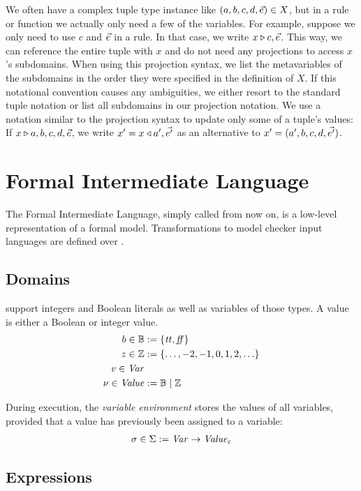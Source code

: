 \documentclass[a4paper,10pt,english]{article}
\begin{document}
	We often have a complex tuple type instance like $(a, b, c, d, \vec{e}) \in X$, but in a rule or
	function we actually only need a few of the variables. For example, suppose we only need to use $c$ and $\vec{e}$ in a rule. In that case,
	we write $x \triangleright c, \vec{e}$.
	This way, we can reference the entire tuple with $x$ and do not need any projections to access $x$'s subdomains. When using this projection syntax, we list the
	metavariables of the subdomains in the order they were specified in the definition of $X$. If this notational convention causes any ambiguities, we either
	resort to the standard tuple notation or list all subdomains in our projection notation. We use a notation similar to the
	projection syntax to update only some of a tuple's values: If $x \triangleright a, b, c, d, \vec{e}$, we write $x' = x
	\triangleleft a', \vec{e'}$ as an alternative to $x' = (a', b, c, d, \vec{e'})$.  

\section{Formal Intermediate Language}
The Formal Intermediate Language, simply called \Fil from now on, is a low-level representation of a formal model. Transformations
to model checker input languages are defined over \Fil.
\subsection{Domains}

\Fil support integers and Boolean literals as well as variables of those types. A value is either a Boolean or integer
value.
\begin{align*}
    b \in \mathbb{B} &:= \{ \mathit{tt}, \mathit{ff} \}
    \\
    z \in \mathbb{Z} &:= \{ \ldots, -2, -1, 0, 1, 2, \ldots \}
    \\
    v \in \mathit{Var}
    \\
    \nu \in \mathit{Value} &:= \mathbb{B} \mid \mathbb{Z}
\end{align*}

During execution, the \textit{variable environment} stores the values of all variables, provided that a value has previously been
assigned to a variable:
\begin{align*}
	\sigma \in \Sigma := \mathit{Var} \rightarrow \mathit{Value}_\varepsilon
\end{align*}

\subsection{Expressions}
\end{document}
